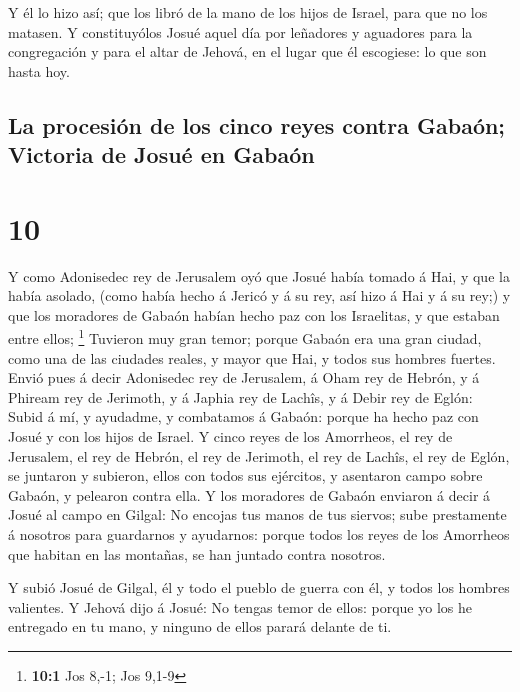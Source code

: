 Y él lo hizo así; que los libró de la mano de los hijos de
Israel, para que no los matasen.  Y constituyólos Josué
aquel día por leñadores y aguadores para la congregación y para el altar
de Jehová, en el lugar que él escogiese: lo que son hasta hoy.

\hypertarget{la-procesiuxf3n-de-los-cinco-reyes-contra-gabauxf3n-victoria-de-josuuxe9-en-gabauxf3n}{%
\subsection{La procesión de los cinco reyes contra Gabaón; Victoria de
Josué en
Gabaón}\label{la-procesiuxf3n-de-los-cinco-reyes-contra-gabauxf3n-victoria-de-josuuxe9-en-gabauxf3n}}

\hypertarget{section-9}{%
\section{10}\label{section-9}}

 Y como Adonisedec rey de Jerusalem oyó que Josué había
tomado á Hai, y que la había asolado, (como había hecho á Jericó y á su
rey, así hizo á Hai y á su rey;) y que los moradores de Gabaón habían
hecho paz con los Israelitas, y que estaban entre ellos; \footnote{\textbf{10:1}
  Jos 8,-1; Jos 9,1-9}  Tuvieron muy gran temor; porque
Gabaón era una gran ciudad, como una de las ciudades reales, y mayor que
Hai, y todos sus hombres fuertes.  Envió pues á decir
Adonisedec rey de Jerusalem, á Oham rey de Hebrón, y á Phiream rey de
Jerimoth, y á Japhia rey de Lachîs, y á Debir rey de Eglón: 
Subid á mí, y ayudadme, y combatamos á Gabaón: porque ha hecho paz con
Josué y con los hijos de Israel.  Y cinco reyes de los
Amorrheos, el rey de Jerusalem, el rey de Hebrón, el rey de Jerimoth, el
rey de Lachîs, el rey de Eglón, se juntaron y subieron, ellos con todos
sus ejércitos, y asentaron campo sobre Gabaón, y pelearon contra ella.
 Y los moradores de Gabaón enviaron á decir á Josué al campo
en Gilgal: No encojas tus manos de tus siervos; sube prestamente á
nosotros para guardarnos y ayudarnos: porque todos los reyes de los
Amorrheos que habitan en las montañas, se han juntado contra nosotros.

 Y subió Josué de Gilgal, él y todo el pueblo de guerra con
él, y todos los hombres valientes.  Y Jehová dijo á Josué:
No tengas temor de ellos: porque yo los he entregado en tu mano, y
ninguno de ellos parará delante de ti.

